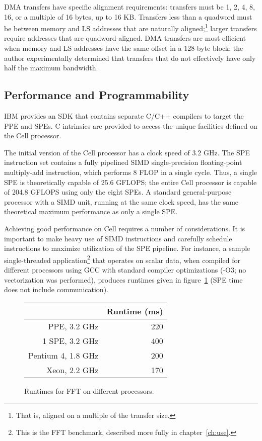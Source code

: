 DMA transfers have specific alignment requirements: transfers must be 1, 2, 4, 8, 16, or a multiple of 16 bytes, up to 16 KB. Transfers less than a quadword must be between memory and LS addresses that are naturally aligned;\footnote{That is, aligned on a multiple of the transfer size.} larger transfers require addresses that are quadword-aligned. DMA transfers are most efficient when memory and LS addresses have the same offset in a 128-byte block; the author experimentally determined that transfers that do not effectively have only half the maximum bandwidth.

\subsection{Performance and Programmability}

IBM provides an SDK that contains separate C/C++ compilers to target the PPE and SPEs. C intrinsics are provided to access the unique facilities defined on the Cell processor.

The initial version of the Cell processor has a clock speed of 3.2 GHz. The SPE instruction set contains a fully pipelined SIMD single-precision floating-point multiply-add instruction, which performs 8 FLOP in a single cycle. Thus, a single SPE is theoretically capable of 25.6 GFLOPS; the entire Cell processor is capable of 204.8 GFLOPS using only the eight SPEs. A standard general-purpose processor with a SIMD unit, running at the same clock speed, has the same theoretical maximum performance as only a single SPE.

Achieving good performance on Cell requires a number of considerations. It is important to make heavy use of SIMD instructions and carefully schedule instructions to maximize utilization of the SPE pipeline. For instance, a sample single-threaded application\footnote{This is the FFT benchmark, described more fully in chapter~\ref{ch:use}.} that operates on scalar data, when compiled for different processors using GCC with standard compiler optimizations (\textsf{-O3}; no vectorization was performed), produces runtimes given in figure~\ref{fig:cell:proc} (SPE time does not include communication).

\begin{figure}[!htb]
\begin{center}
\begin{tabular}{|r|r|}
\hline
& Runtime (ms) \\
\hline
PPE, 3.2 GHz & 220 \\
\hline
1 SPE, 3.2 GHz & 400 \\
\hline
Pentium 4, 1.8 GHz & 200 \\
\hline
Xeon, 2.2 GHz & 170 \\
\hline
\end{tabular}
\end{center}
\caption{Runtimes for FFT on different processors.}
\label{fig:cell:proc}
\end{figure}

